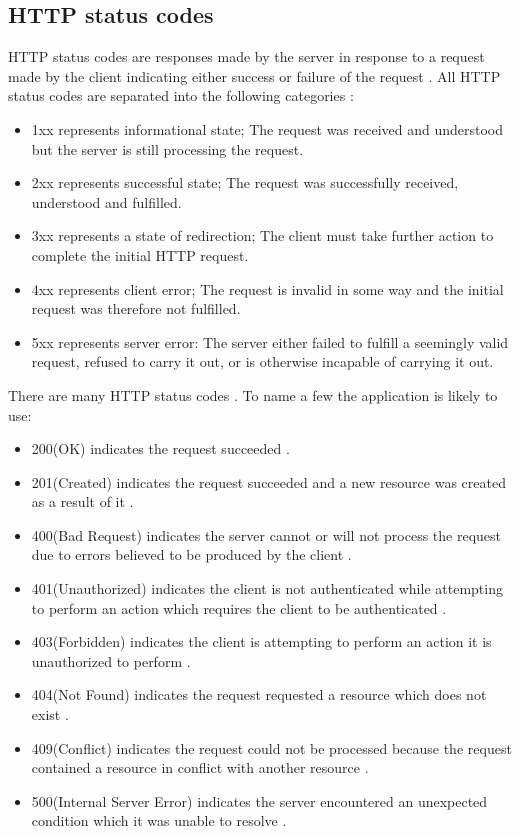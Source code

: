 \subsection{HTTP status codes}
HTTP status codes are responses made by the server in response to a request made by the client indicating either success or failure of the request \cite{http_vs_https}.
All HTTP status codes are separated into the following categories \cite{mozilla_http}:
\begin{itemize}
    \item 1xx represents informational state; The request was received and understood but the server is still processing the request.
    \item 2xx represents successful state; The request was successfully received, understood and fulfilled.
    \item 3xx represents a state of redirection; The client must take further action to complete the initial HTTP request.
    \item 4xx represents client error; The request is invalid in some way and the initial request was therefore not fulfilled.
    \item 5xx represents server error: The server either failed to fulfill a seemingly valid request, refused to carry it out, or is otherwise incapable of carrying it out.
\end{itemize}

There are many HTTP status codes \cite{http_status_codes_list}.
To name a few the application is likely to use:
\begin{itemize}
    \item 200(OK) indicates the request succeeded \cite{mozilla_http_status_codes_success}.
    \item 201(Created) indicates the request succeeded and a new resource was created as a result of it \cite{mozilla_http_status_codes_success}.
    \item 400(Bad Request) indicates the server cannot or will not process the request due to errors believed to be produced by the client \cite{mozilla_http_status_codes_client_error}.
    \item 401(Unauthorized) indicates the client is not authenticated while attempting to perform an action which requires the client to be authenticated \cite{mozilla_http_status_codes_client_error}.
    \item 403(Forbidden) indicates the client is attempting to perform an action it is unauthorized to perform \cite{mozilla_http_status_codes_client_error}.
    \item 404(Not Found) indicates the request requested a resource which does not exist \cite{mozilla_http_status_codes_client_error}.
    \item 409(Conflict) indicates the request could not be processed because the request contained a resource in conflict with another resource \cite{mozilla_http_status_codes_client_error}.
    \item 500(Internal Server Error) indicates the server encountered an unexpected condition which it was unable to resolve \cite{mozilla_http_status_codes_server_error}.
\end{itemize}


